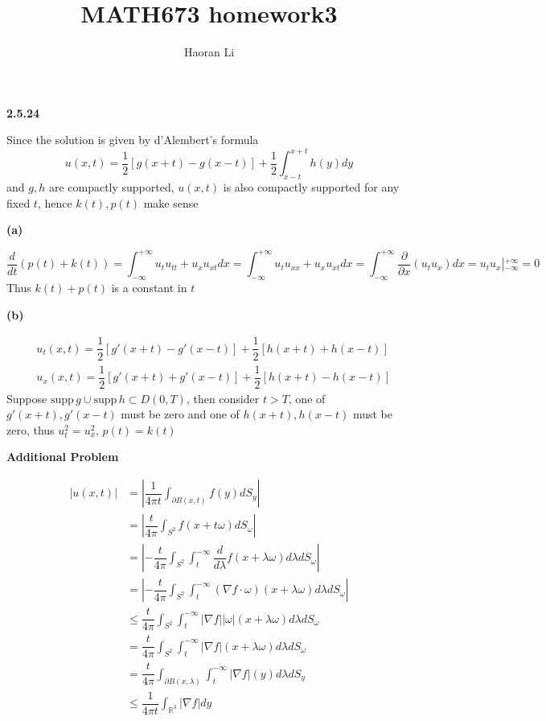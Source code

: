 \documentclass[12pt]{article}
\title{MATH673 homework3}
\author{Haoran Li}
\date{}
\begin{document}
\maketitle
\textbf{2.5.24} \par
Since the solution is given by d'Alembert's formula
\[
u(x,t)=\dfrac{1}{2}[g(x+t)-g(x-t)]+\dfrac{1}{2}\int_{x-t}^{x+t}h(y)dy
\]
and $g,h$ are compactly supported, $u(x,t)$ is also compactly supported for any fixed $t$, hence $k(t),p(t)$ make sense \par
\textbf{(a)} \par
\[
\dfrac{d}{dt}(p(t)+k(t))=\int_{-\infty}^{+\infty}u_tu_{tt}+u_xu_{xt}dx=\int_{-\infty}^{+\infty}u_tu_{xx}+u_xu_{xt}dx
=\int_{-\infty}^{+\infty}\dfrac{\partial}{\partial x}\left(u_tu_x\right) dx=u_tu_x\left|_{-\infty}^{+\infty}\right.=0
\]
Thus $k(t)+p(t)$ is a constant in $t$ \par
\textbf{(b)} \par
\[
\begin{aligned}
&u_t(x,t)=\dfrac{1}{2}[g'(x+t)-g'(x-t)]+\dfrac{1}{2}[h(x+t)+h(x-t)] \\
&u_x(x,t)=\dfrac{1}{2}[g'(x+t)+g'(x-t)]+\dfrac{1}{2}[h(x+t)-h(x-t)]
\end{aligned}
\]
Suppose $\mathrm{supp}\,g\cup\mathrm{supp}\,h\subset D(0,T)$, then consider $t>T$, one of $g'(x+t),g'(x-t)$ must be zero and one of $h(x+t),h(x-t)$ must be zero, thus $u_t^2=u_x^2$, $p(t)=k(t)$ \par
\textbf{Additional Problem} \par
\[
\begin{aligned}
|u(x,t)|
&=\left|\dfrac{1}{4\pi t}\int_{\partial B(x,t)}f(y)dS_y\right| \\
&=\left|\dfrac{t}{4\pi}\int_{S^2}f(x+t\omega)dS_\omega\right| \\
&=\left|-\dfrac{t}{4\pi}\int_{S^2}\int_t^{-\infty}\dfrac{d}{d\lambda}f(x+\lambda\omega)d\lambda dS_\omega\right| \\
&=\left|-\dfrac{t}{4\pi}\int_{S^2}\int_t^{-\infty}(\nabla f\cdot\omega)(x+\lambda\omega)d\lambda dS_\omega\right| \\
&\leq\dfrac{t}{4\pi}\int_{S^2}\int_t^{-\infty}\left|\nabla f\right||\omega|(x+\lambda\omega)d\lambda dS_\omega \\
&=\dfrac{t}{4\pi}\int_{S^2}\int_t^{-\infty}\left|\nabla f\right|(x+\lambda\omega)d\lambda dS_\omega \\
&=\dfrac{t}{4\pi}\int_{\partial B(x,\lambda)}\int_t^{-\infty}\left|\nabla f\right|(y)d\lambda dS_y \\
&\leq\dfrac{1}{4\pi t}\int_{\mathbb{R}^3}\left|\nabla f\right|dy \\
\end{aligned}
\]
\end{document}
